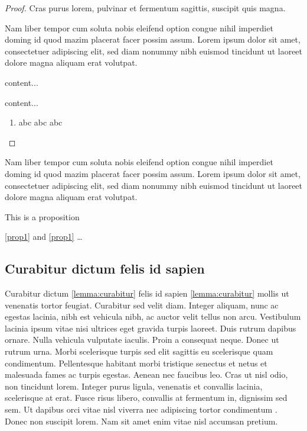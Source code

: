 \documentclass[a4paper,UKenglish,cleveref, autoref, thm-restate]{lipics-v2021}
\begin{document}
\begin{proof}
Cras purus lorem, pulvinar et fermentum sagittis, suscipit quis magna.


Nam liber tempor cum soluta nobis eleifend option congue nihil imperdiet doming id quod mazim placerat facer possim assum. Lorem ipsum dolor sit amet, consectetuer adipiscing elit, sed diam nonummy nibh euismod tincidunt ut laoreet dolore magna aliquam erat volutpat.
\begin{claim}
content...
\end{claim}
\begin{claimproof}
content...
    \begin{enumerate}
        \item abc abc abc %
    \end{enumerate}
\end{claimproof}

\end{proof}

\begin{corollary}
\label{lemma:curabitur}
Nam liber tempor cum soluta nobis eleifend option congue nihil imperdiet doming id quod mazim placerat facer possim assum. Lorem ipsum dolor sit amet, consectetuer adipiscing elit, sed diam nonummy nibh euismod tincidunt ut laoreet dolore magna aliquam erat volutpat.
\end{corollary}

\begin{proposition}\label{prop1}
This is a proposition
\end{proposition}

\autoref{prop1} and \cref{prop1} \ldots

\subsection{Curabitur dictum felis id sapien}

Curabitur dictum \cref{lemma:curabitur} felis id sapien \autoref{lemma:curabitur} mollis ut venenatis tortor feugiat. Curabitur sed velit diam. Integer aliquam, nunc ac egestas lacinia, nibh est vehicula nibh, ac auctor velit tellus non arcu. Vestibulum lacinia ipsum vitae nisi ultrices eget gravida turpis laoreet. Duis rutrum dapibus ornare. Nulla vehicula vulputate iaculis. Proin a consequat neque. Donec ut rutrum urna. Morbi scelerisque turpis sed elit sagittis eu scelerisque quam condimentum. Pellentesque habitant morbi tristique senectus et netus et malesuada fames ac turpis egestas. Aenean nec faucibus leo. Cras ut nisl odio, non tincidunt lorem. Integer purus ligula, venenatis et convallis lacinia, scelerisque at erat. Fusce risus libero, convallis at fermentum in, dignissim sed sem. Ut dapibus orci vitae nisl viverra nec adipiscing tortor condimentum \cite{DBLP:journals/cacm/Dijkstra68a}. Donec non suscipit lorem. Nam sit amet enim vitae nisl accumsan pretium.
\end{document}
